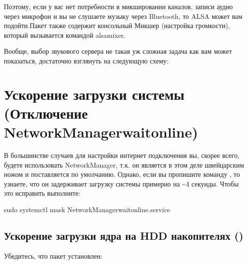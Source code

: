 \documentclass[letterpaper,10pt,russian,openany]{sphinxmanual}
\begin{document}
\sphinxAtStartPar
Поэтому, если у вас нет потребности в микшировании каналов,
записи аудио через микрофон и вы не слушаете музыку через Bluetooth, то ALSA может вам подойти.Пакет  также содержит консольный Микшер (настройка громкости), который вызывается командой alsamixer.

\sphinxAtStartPar
Вообще, выбор звукового сервера не такая уж сложная задача как вам может показаться,
достаточно взглянуть на следующую схему:

\noindent{}

\ignorespaces 

\section{Ускорение загрузки системы (Отключение NetworkManager\sphinxhyphen{}wait\sphinxhyphen{}online)}
\label{\detokenize{source/generic-system-acceleration:networkmanager-wait-online}}\label{\detokenize{source/generic-system-acceleration:startup-acceleration}}\label{\detokenize{source/generic-system-acceleration:index-8}}
\sphinxAtStartPar
В большинстве случаев для настройки интернет подключения вы, скорее всего, будете использовать NetworkManager,
т.к. он является в этом деле швейцарским ножом и поставляется по умолчанию.
Однако, если вы пропишите команду , то узнаете, что он задерживает загрузку системы примерно на \textasciitilde{}4 секунды.
Чтобы это исправить выполните:

\begin{sphinxVerbatim}[commandchars=\\\{\}]
sudo systemctl mask NetworkManager\PYGZhy{}wait\PYGZhy{}online.service
\end{sphinxVerbatim}

\ignorespaces 

\subsection{Ускорение загрузки ядра на HDD накопителях ()}
\label{\detokenize{source/generic-system-acceleration:hdd}}\label{\detokenize{source/generic-system-acceleration:speed-up-hdd-startup}}\label{\detokenize{source/generic-system-acceleration:index-9}}
\sphinxAtStartPar
Убедитесь, что пакет  установлен:
\end{document}

